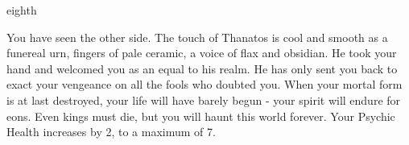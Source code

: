 \documentclass[greennotebook]{Kos}
\begin{document}
\begin{page}{eighth}

You have seen the other side. The touch of Thanatos is cool and smooth as a funereal urn, fingers of pale ceramic, a voice of flax and obsidian. He took your hand and welcomed you as an equal to his realm. He has only sent you back to exact your vengeance on all the fools who doubted you. When your mortal form is at last destroyed, your life will have barely begun - your spirit will endure for eons. Even kings must die, but you will haunt this world forever. Your Psychic Health increases by 2, to a maximum of 7.

\end{page}

\endnotebook
\end{document}
